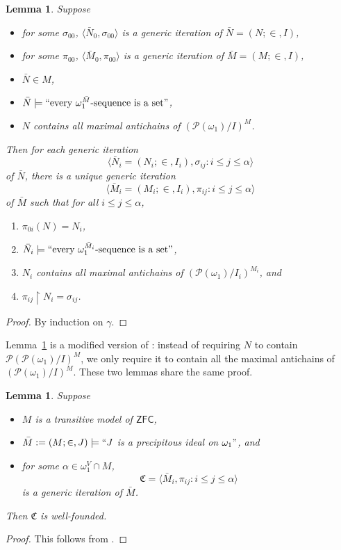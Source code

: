 \documentclass[12pt, twoside]{memoir}
\numberwithin{equation}{section}
\newtheorem{lem}[thm]{Lemma}
\theoremstyle{definition}
\theoremstyle{remark}
\theoremstyle{definition}
\theoremstyle{definition}
\theoremstyle{definition}
\theoremstyle{remark}
\begin{document}
\begin{lem}\label{itercopy}
Suppose 
\begin{itemize}
    \item for some $\sigma_{00}$, $\langle \bar{N}_0, \sigma_{00} \rangle$ is a generic iteration of $\bar{N} = (N; \in, I)$,
    \item for some $\pi_{00}$, $\langle \bar{M}_0, \pi_{00} \rangle$ is a generic iteration of $\bar{M} = (M; \in, I)$,
    \item $\bar{N} \in M$,
    \item $\bar{N} \models ``\text{every } {\omega_1^{\bar{M}}} \text{-sequence is a set}"$,
    \item $N$ contains all maximal antichains of $(\mathcal{P}(\omega_1) / I)^{M}$.
\end{itemize}
Then for each generic iteration $$\langle \bar{N}_i = (N_i; \in, I_i), \sigma_{ij} : i \leq j \leq \alpha \rangle$$ of $\bar{N}$, there is a unique generic iteration $$\langle \bar{M}_i = (M_i; \in, I_i), \pi_{ij} : i \leq j \leq \alpha \rangle$$ of $\bar{M}$ such that for all $i \leq j \leq \alpha$,
\begin{enumerate}[label=(\alph*)]
    \item $\pi_{0i}(N) = N_i$,
    \item $\bar{N}_i \models ``\text{every } {\omega_1^{\bar{M}_i}} \text{-sequence is a set}"$,
    \item $N_i$ contains all maximal antichains of $(\mathcal{P}(\omega_1) / I_i)^{M_i}$, and
    \item $\pi_{ij} \restriction N_i = \sigma_{ij}$.
\end{enumerate}
\end{lem}
\begin{proof}
By induction on $\gamma$.
\end{proof}

Lemma~\ref{itercopy} is a modified version of \cite[Lemma 1.5]{larson}: instead of requiring $N$ to contain $\mathcal{P}(\mathcal{P}(\omega_1) / I)^{M}$, we only require it to contain all the maximal antichains of $(\mathcal{P}(\omega_1) / I)^{M}$. These two lemmas share the same proof.

\begin{lem}\label{iterlength}
Suppose
\begin{itemize}
    \item $M$ is a transitive model of $\mathsf{ZFC}$,
    \item $\bar{M} := (M; \in, J) \models ``J$ is a precipitous ideal on $\omega_1"$, and
    \item for some $\alpha \in \omega_1^V \cap M$, $$\mathfrak{C} = \langle \bar{M}_i, \pi_{ij} : i \leq j \leq \alpha \rangle$$ is a generic iteration of $\bar{M}$.
\end{itemize}
Then $\mathfrak{C}$ is well-founded.
\end{lem}
\begin{proof}
This follows from \cite[Lemma 1.6]{larson}.
\end{proof}
\end{document}
